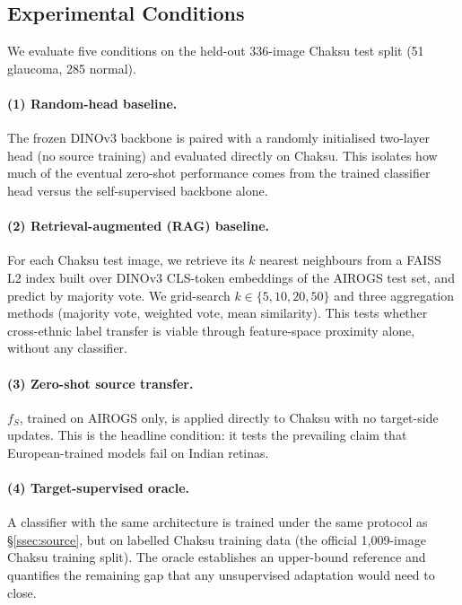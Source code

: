\documentclass[11pt]{article}
\newcommand{\src}{AIROGS}
\begin{document}
\subsection{Experimental Conditions}
\label{ssec:conditions}

We evaluate five conditions on the held-out 336-image Chaksu test split
(51 glaucoma, 285 normal).

\paragraph{(1) Random-head baseline.}
The frozen DINOv3 backbone is paired with a randomly initialised two-layer
head (no source training) and evaluated directly on Chaksu. This isolates
how much of the eventual zero-shot performance comes from the trained
classifier head versus the self-supervised backbone alone.

\paragraph{(2) Retrieval-augmented (RAG) baseline.}
For each Chaksu test image, we retrieve its $k$ nearest neighbours from a
FAISS L2 index built over DINOv3 CLS-token embeddings of the \src{} test
set, and predict by majority vote. We grid-search $k \in \{5, 10, 20, 50\}$
and three aggregation methods (majority vote, weighted vote, mean
similarity). This tests whether cross-ethnic label transfer is viable
through feature-space proximity alone, without any classifier.

\paragraph{(3) Zero-shot source transfer.}
$f_S$, trained on \src{} only, is applied directly to Chaksu with no
target-side updates. This is the headline condition: it tests the
prevailing claim that European-trained models fail on Indian retinas.

\paragraph{(4) Target-supervised oracle.}
A classifier with the same architecture is trained under the same protocol
as \S\ref{ssec:source}, but on labelled Chaksu training data (the official
1{,}009-image Chaksu training split). The oracle establishes an upper-bound
reference and quantifies the remaining gap that any unsupervised adaptation
would need to close.
\end{document}
